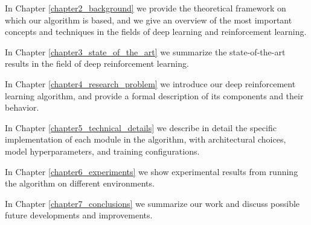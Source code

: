 In Chapter \ref{chapter2_background} we provide the theoretical framework on
which our algorithm is based, and we give an overview of the most important 
concepts and techniques in the fields of deep learning and reinforcement 
learning.

In Chapter \ref{chapter3_state_of_the_art} we summarize the state-of-the-art 
results in the field of deep reinforcement learning.

In Chapter \ref{chapter4_research_problem} we introduce our deep reinforcement 
learning algorithm, and provide a formal description of its components and 
their behavior.

In Chapter \ref{chapter5_technical_details} we describe in detail the specific 
implementation of each module in the algorithm, with architectural choices, 
model hyperparameters, and training configurations.

In Chapter \ref{chapter6_experiments} we show experimental results from running
the algorithm on different environments.

In Chapter \ref{chapter7_conclusions} we summarize our work and discuss possible
future developments and improvements.


